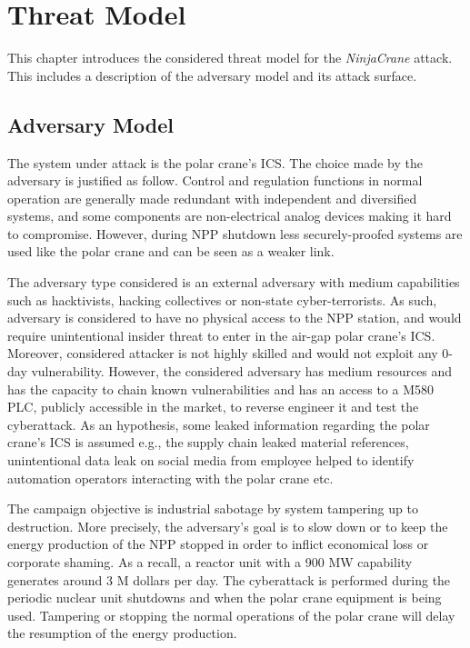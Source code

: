 \chapter{Threat Model}
\label{chapter:threat-model}

This chapter introduces the considered threat model for the \emph{NinjaCrane} attack. This includes a description of the adversary model and its attack surface. 

\section{Adversary Model}

The system under attack is the polar crane's ICS. The choice made by the adversary is justified as follow. Control and regulation functions in normal operation are generally made redundant with independent and diversified systems, and some components are non-electrical analog devices making it hard to compromise. However, during NPP shutdown less securely-proofed systems are used like the polar crane and can be seen as a weaker link. 

The adversary type considered is an external adversary with medium capabilities such as hacktivists, hacking collectives or non-state cyber-terrorists. As such, adversary is considered to have no physical access to the NPP station, and would require unintentional insider threat to enter in the air-gap polar crane's ICS. Moreover, considered attacker is not highly skilled and would not exploit any 0-day vulnerability. However, the considered adversary has medium resources and has the capacity to chain known vulnerabilities and has an access to a M580 PLC, publicly accessible in the market, to reverse engineer it and test the cyberattack. As an hypothesis, some leaked information regarding the polar crane's ICS is assumed e.g., the supply chain leaked material references, unintentional data leak on social media from employee helped to identify automation operators interacting with the polar crane etc.

The campaign objective is industrial sabotage by system tampering up to destruction. More precisely, the adversary's goal is to slow down or to keep the energy production of the NPP stopped in order to inflict economical loss or corporate shaming. As a recall, a reactor unit with a 900 MW capability generates around 3 M dollars per day. The cyberattack is performed during the periodic nuclear unit shutdowns and when the polar crane equipment is being used. Tampering or stopping the normal operations of the polar crane will delay the resumption of the energy production.

